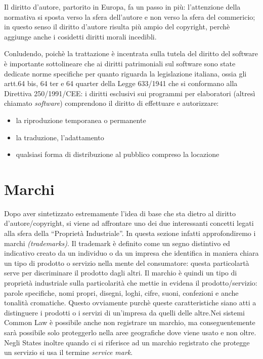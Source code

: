 Il diritto d’autore, partorito in Europa, fa un passo in più: l’attenzione della normativa si sposta verso la sfera dell’autore e non verso la sfera del commericio; in questo senso il diritto d’autore risulta più ampio del copyright, perchè aggiunge anche i cosidetti diritti morali incedibli.


Conludendo, poichè la trattazione è incentrata sulla tutela del diritto del software è importante sottolineare che ai diritti patrimoniali sul software sono state dedicate norme specifiche per quanto riguarda la legislazione italiana, ossia gli artt.64 bis, 64 ter e 64 quarter della Legge 633/1941 che si conformano alla Direttiva 250/1991/CEE: i diritti esclusivi sui programmi per elaboratori (altresì chiamato \textit{software}) comprendono il diritto di effettuare e autorizzare:

\begin{itemize}
\item la riproduzione temporanea o permanente
\item la traduzione, l’adattamento
\item qualsiasi forma di distribuzione al pubblico compreso la locazione
\end{itemize}



\section{Marchi}
Dopo aver sintetizzato estremamente l'idea di base che sta dietro al diritto d'autore/copyright, si viene ad affrontare uno dei due interessanti concetti legati alla sfera della ``Proprietà Industriale''. In questa sezione infatti approfondiremo i marchi \textit{(trademarks)}.
Il trademark è definito come un segno distintivo ed indicativo creato da un individuo o da un impresa che identifica in maniera chiara un tipo di prodotto o servizio nella mente del consumatore: questa particolartà serve per discriminare il prodotto dagli altri. Il marchio è quindi un tipo di proprietà industriale sulla particolarità che mettie in evidena il prodotto/servizio: parole specifiche, nomi propri, disegni, loghi, cifre, suoni, confezioni e anche tonalità cromatiche. Questo ovviamente purchè queste caratteristiche siano atti a distinguere i prodotti o i servizi di un'impresa da quelli delle altre.Nei sistemi Common Law è possibile anche non registrare un marchio, ma conseguentemente sarà possibile solo proteggerlo nella aree geografiche dove viene usato e non oltre. Negli States inoltre quando ci si riferisce ad un marchio registrato che protegge un servizio si usa il termine \textit{service mark}.

